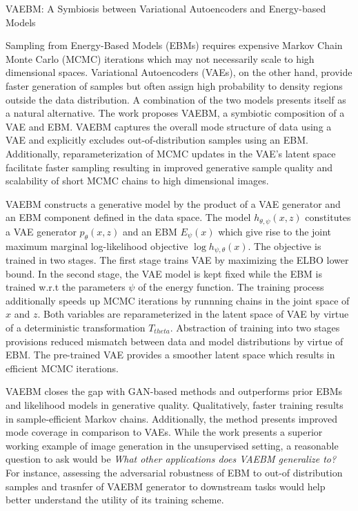 \documentclass[12pt,letterpaper]{article}
\begin{document}
\begin{center}
  \large{VAEBM: A Symbiosis between Variational Autoencoders and Energy-based Models}
\end{center}

Sampling from Energy-Based Models (EBMs) requires expensive Markov Chain Monte Carlo (MCMC) iterations which may not necessarily scale to high dimensional spaces. Variational Autoencoders (VAEs), on the other hand, provide faster generation of samples but often assign high probability to density regions outside the data distribution. A combination of the two models presents itself as a natural alternative. The work proposes VAEBM, a symbiotic composition of a VAE and EBM. VAEBM captures the overall mode structure of data using a VAE and explicitly excludes out-of-distribution samples using an EBM. Additionally, reparameterization of MCMC updates in the VAE's latent space facilitate faster sampling resulting in improved generative sample quality and scalability of short MCMC chains to high dimensional images.

VAEBM constructs a generative model by the product of a VAE generator and an EBM component defined in the data space. The model $h_{\theta,\psi}(x,z)$ constitutes a VAE generator $p_{\theta}(x,z)$ and an EBM $E_{\psi}(x)$ which give rise to the joint maximum marginal log-likelihood objective $\log h_{\psi,\theta}(x)$. The objective is trained in two stages. The first stage trains VAE by maximizing the ELBO lower bound. In the second stage, the VAE model is kept fixed while the EBM is trained w.r.t the parameters $\psi$ of the energy function. The training process additionally speeds up MCMC iterations by runnning chains in the joint space of $x$ and $z$. Both variables are reparameterized in the latent space of VAE by virtue of a deterministic transformation $T_{theta}$. Abstraction of training into two stages provisions reduced mismatch between data and model distributions by virtue of EBM. The pre-trained VAE provides a smoother latent space which results in efficient MCMC iterations. 

VAEBM closes the gap with GAN-based methods and outperforms prior EBMs and likelihood models in generative quality. Qualitatively, faster training results in sample-efficient Markov chains. Additionally, the method presents improved mode coverage in comparison to VAEs. While the work presents a superior working example of image generation in the unsupervised setting, a reasonable question to ask would be \textit{What other applications does VAEBM generalize to?} For instance, assessing the adversarial robustness of EBM to out-of distribution samples and trasnfer of VAEBM generator to downstream tasks would help better understand the utility of its training scheme.
\end{document}
